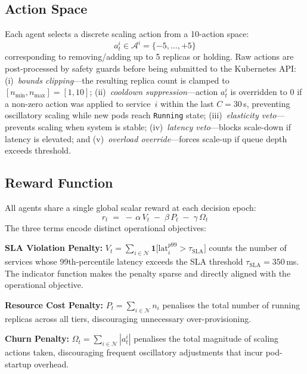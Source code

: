 \documentclass[conference]{IEEEtran}
\begin{document}
\subsection{Action Space}

Each agent selects a discrete scaling action from a 10-action space:
\begin{equation}
  a_t^i \in \mathcal{A}^i = \{-5,\ldots,+5\}
  \label{eq:action}
\end{equation}
corresponding to removing/adding up to 5 replicas or holding. Raw
actions are post-processed by safety guards before being submitted to
the Kubernetes API: (i)~\emph{bounds clipping}---the resulting replica
count is clamped to $[n_{\min}, n_{\max}] = [1, 10]$;
(ii)~\emph{cooldown suppression}---action $a_t^i$ is overridden to $0$
if a non-zero action was applied to service~$i$ within the last
$C = 30$\,s, preventing oscillatory scaling while new pods reach
\texttt{Running} state; (iii)~\emph{elasticity veto}---prevents scaling
when system is stable; (iv)~\emph{latency veto}---blocks scale-down if
latency is elevated; and (v)~\emph{overload override}---forces scale-up
if queue depth exceeds threshold.

\subsection{Reward Function}

All agents share a single global scalar reward at each decision
epoch:
\begin{equation}
  r_t \;=\; -\,\alpha\,V_t \;-\; \beta\,P_t \;-\; \gamma\,\Omega_t
  \label{eq:reward}
\end{equation}
The three terms encode distinct operational objectives:

\textbf{SLA Violation Penalty:}
$V_t = \sum_{i \in \mathcal{N}}
\mathbf{1}\bigl[\mathrm{lat}^{p99}_i > \tau_{\mathrm{SLA}}\bigr]$
counts the number of services whose 99th-percentile latency exceeds
the SLA threshold $\tau_{\mathrm{SLA}} = 350$\,ms. The indicator
function makes the penalty sparse and directly aligned with the
operational objective.

\textbf{Resource Cost Penalty:}
$P_t = \sum_{i \in \mathcal{N}} n_i$
penalises the total number of running replicas across all tiers,
discouraging unnecessary over-provisioning.

\textbf{Churn Penalty:}
$\Omega_t = \sum_{i \in \mathcal{N}} |a_t^i|$
penalises the total magnitude of scaling actions taken, discouraging
frequent oscillatory adjustments that incur pod-startup overhead.
\end{document}
